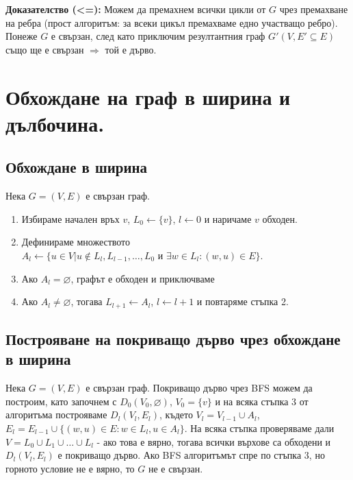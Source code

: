 \documentclass[fleqn,12pt]{article}
\begin{document}
\begin{flushleft}
\textbf{Доказателство (<=):} Можем да премахнем всички цикли от $G$ чрез премахване на ребра (прост алгоритъм: за всеки цикъл премахваме едно участващо ребро).
Понеже $G$ е свързан, след като приключим резултантния граф $G'(V, E' \subseteq E)$ също ще е свързан $\Rightarrow$ той е дърво.

\section{Обхождане на граф в ширина и дълбочина.}

\subsection{Обхождане в ширина} 
Нека $G = (V, E)$ е свързан граф. 
\begin{enumerate}
	\item Избираме начален връх $v$, $L_0 \leftarrow \{ v \}$, $l \leftarrow 0$ и наричаме $v$ обходен.
	\item Дефинираме множеството $A_l \leftarrow \{ u \in V | u \notin L_l, L_{l-1}, \dots, L_0 \text{ и } \exists w \in L_l : (w, u) \in E \}$.
	\item Ако $A_l = \varnothing$, графът е обходен и приключваме
	\item Ако $A_l \neq \varnothing$, тогава $L_{l+1} \leftarrow A_l$, $ l \leftarrow l + 1$ и повтаряме стъпка 2.
\end{enumerate}

\subsection{Построяване на покриващо дърво чрез обхождане в ширина} 
Нека $G = (V, E)$ е свързан граф.
Покриващо дърво чрез BFS можем да построим, като започнем с $D_0(V_0, \varnothing)$, $V_0 = \{ v \}$ и на всяка стъпка 3 
от алгоритъма построяваме $D_l(V_l, E_l)$, където $V_l = V_{l - 1} \cup A_l$, 
$E_l = E_{l - 1} \cup \{ (w, u) \in E : w \in L_l, u \in A_l \}$. На всяка стъпка проверяваме дали 
$V = L_0 \cup L_1 \cup \dots \cup L_l$ - ако това е вярно, тогава всички върхове са обходени и $D_l(V_l, E_l)$ е покриващо дърво.
Ако BFS алгоритъмът спре по стъпка 3, но горното условие не е вярно, то $G$ не е свързан.
\vspace{10mm}


\end{flushleft}
\end{document}
